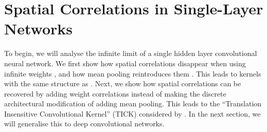 \documentclass{article}
\begin{document}


\section{Spatial Correlations in Single-Layer Networks}
To begin, we will analyse the infinite limit of a single hidden layer convolutional neural network. We first show how spatial correlations disappear when using infinite weights \citet{garriga2018infiniteconv,novak2019infiniteconv}, and how mean pooling reintroduces them \citet{novak2019infiniteconv}. This leads to kernels with the same structure as . Next, we show how spatial correlations can be recovered by adding weight correlations instead of making the discrete architectural modification of adding mean pooling. This leads to the 
``Translation Insensitive Convolutional Kernel'' (TICK) considered by \citet{dutordoir2020}. In the next section, we will generalise this to deep convolutional networks.
\end{document}
